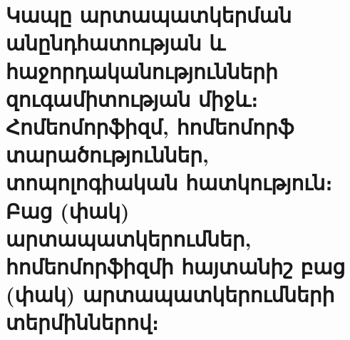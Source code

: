 \documentclass[./main.tex]{subfiles}
\begin{document}
\onehalfspacing
\setcounter{section}{10}
\section{Կապը արտապատկերման անընդհատության և հաջորդականությունների զուգամիտության միջև։ Հոմեոմորֆիզմ, հոմեոմորֆ տարածություններ, տոպոլոգիական հատկություն։ Բաց (փակ) արտապատկերումներ, հոմեոմորֆիզմի հայտանիշ բաց (փակ) արտապատկերումների տերմիններով։}\label{sec:11}




\end{document}
